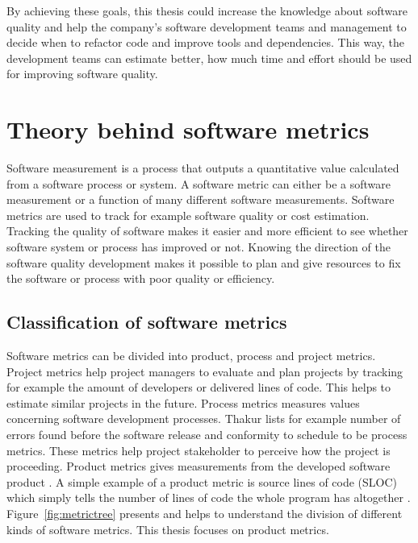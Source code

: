 By achieving these goals, this thesis could increase the knowledge about software quality and help the company’s software development teams and management to decide when to refactor code and improve tools and dependencies. This way, the development teams can estimate better, how much time and effort should be used for improving software quality.





\chapter{Theory behind software metrics}
\label{chap:theory}

Software measurement is a process that outputs a quantitative value calculated from a software process or system. A software metric can either be a software measurement or a function of many different software measurements. Software metrics are used to track for example software quality or cost estimation. Tracking the quality of software makes it easier and more efficient to see whether software system or process has improved or not. Knowing the direction of the software quality development makes it possible to plan and give resources to fix the software or process with poor quality or efficiency. 

\section{Classification of software metrics}

Software metrics can be divided into product, process and project metrics. Project metrics \cite{dineshthakur} help project managers to evaluate and plan projects by tracking for example the amount of developers or delivered lines of code. This helps to estimate similar projects in the future. Process metrics measures values concerning software development processes. Thakur lists for example number of errors found before the software release and conformity to schedule to be process metrics. These metrics help project stakeholder to perceive how the project is proceeding.
Product metrics gives measurements from the developed software product \cite{sommerville2011software}.  A simple example of a product metric is source lines of code (SLOC) which simply tells the number of lines of code the whole program has altogether \cite{nguyen2007sloc}. Figure~\ref{fig:metrictree} presents and helps to understand the division of different kinds of software metrics. This thesis focuses on product metrics. 

